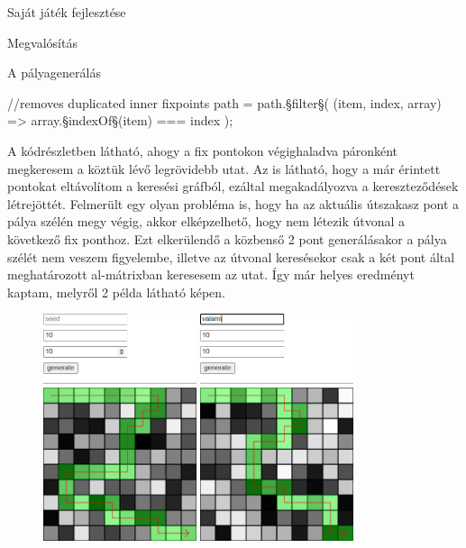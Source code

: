 \begin{MyChapter}{Saját játék fejlesztése}
\begin{MySection}{Megvalósítás}
\begin{MySubSection}{A pályagenerálás}
\begin{javascript}
//removes duplicated inner fixpoints
path = path.§\color{jsMethod}filter§(
	(item, index, array) => array.§\color{jsMethod}indexOf§(item) === index
);
			\end{javascript}
			A kódrészletben látható, ahogy a fix pontokon végighaladva páronként megkeresem a köztük lévő legrövidebb utat. Az is látható, hogy a már érintett pontokat eltávolítom a keresési gráfból, ezáltal megakadályozva a kereszteződések létrejöttét. Felmerült egy olyan probléma is, hogy ha az aktuális útszakasz pont a pálya szélén megy végig, akkor elképzelhető, hogy nem létezik útvonal a következő fix ponthoz. Ezt elkerülendő a közbenső 2 pont generálásakor a pálya szélét nem veszem figyelembe, illetve az útvonal keresésekor csak a két pont által meghatározott al-mátrixban keresesem az utat. Így már helyes eredményt kaptam, melyről 2 példa látható  képen.
			
			\begin{figure}[ht!]
				\centering
				\includegraphics[width=0.4\textwidth]{kepek/map/generate-example-1.png}
				\hspace{5mm}
				\includegraphics[width=0.4\textwidth]{kepek/map/generate-example-2.png}
				

\end{figure}
\end{MySubSection}
\end{MySection}
\end{MyChapter}
